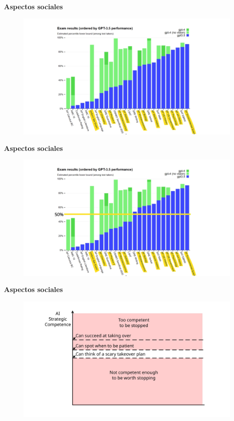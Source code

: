 \documentclass{beamer}
\begin{document}
\begin{frame}{\bfseries Aspectos sociales}
    \begin{figure}
        \centering
        \includegraphics[width=1\linewidth]{tests-2.png}
        \captionsetup{labelformat=empty}
    \end{figure}
\end{frame}

\begin{frame}{\bfseries Aspectos sociales}
    \begin{figure}
        \centering
        \includegraphics[width=1\linewidth]{tests-3.png}
        \captionsetup{labelformat=empty}
    \end{figure}
\end{frame}

\begin{frame}{\bfseries Aspectos sociales}
    \begin{figure}
        \centering
        \includegraphics[width=1\linewidth]{dangers.png}
        \captionsetup{labelformat=empty}
    \end{figure}
\end{frame}
\end{document}
